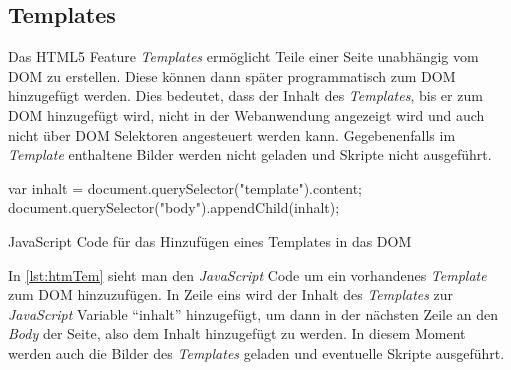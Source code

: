 \documentclass[12pt, paper=a4, bibtotoc, toc=listof]{scrreprt}
\begin{document}
			\subsection{Templates}
			\label{subsec:Templates}
			Das \ac{HTML5} Feature \emph{Templates} ermöglicht Teile einer Seite unabhängig vom \ac{DOM} zu erstellen. Diese können dann später programmatisch zum \ac{DOM} hinzugefügt werden. Dies bedeutet, dass der Inhalt des \emph{Templates}, bis er zum \ac{DOM} hinzugefügt wird, nicht in der Webanwendung angezeigt wird und auch nicht über \ac{DOM} Selektoren angesteuert werden kann. Gegebenenfalls im \emph{Template} enthaltene Bilder werden nicht geladen und Skripte nicht ausgeführt. 
			\begin{listing}
				\begin{JavaScriptcode*}{}
var inhalt = document.querySelector("template").content;
document.querySelector("body").appendChild(inhalt);
				\end{JavaScriptcode*}
				\caption{JavaScript Code für das Hinzufügen eines Templates in das DOM}
				\label{lst:htmTem}
			\end{listing}
			In \ref{lst:htmTem} sieht man den \emph{JavaScript} Code um ein vorhandenes \emph{Template} zum \ac{DOM} hinzuzufügen. In Zeile eins wird der Inhalt des \emph{Templates} zur \emph{JavaScript} Variable \enquote{inhalt} hinzugefügt, um dann in der nächsten Zeile an den \emph{Body} der Seite, also dem Inhalt hinzugefügt zu werden. In diesem Moment werden auch die Bilder des \emph{Templates} geladen und eventuelle Skripte ausgeführt.
\end{document}
